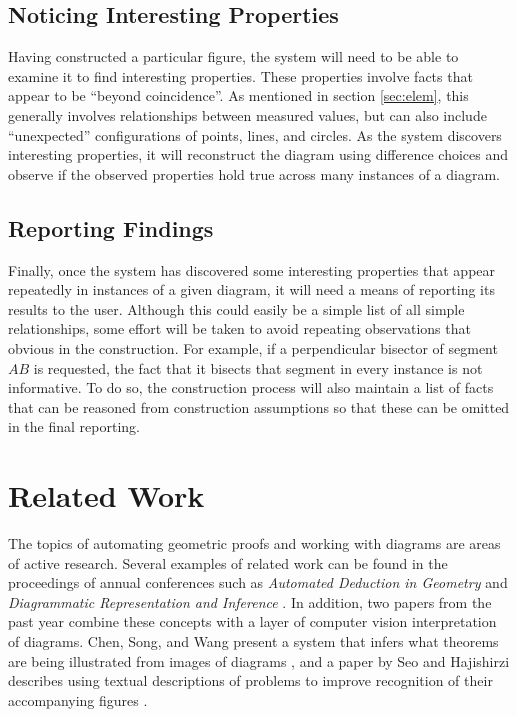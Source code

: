 \documentclass[10pt]{article}
\begin{document}
\subsection{Noticing Interesting Properties}
\label{sec:interest}

Having constructed a particular figure, the system will need to be
able to examine it to find interesting properties.  These properties
involve facts that appear to be ``beyond coincidence''.  As mentioned
in section \ref{sec:elem}, this generally involves relationships
between measured values, but can also include ``unexpected''
configurations of points, lines, and circles.  As the system discovers
interesting properties, it will reconstruct the diagram using
difference choices and observe if the observed properties hold true
across many instances of a diagram.

\subsection{Reporting Findings}

Finally, once the system has discovered some interesting properties
that appear repeatedly in instances of a given diagram, it will need a
means of reporting its results to the user.  Although this could
easily be a simple list of all simple relationships, some effort will
be taken to avoid repeating observations that obvious in the
construction.  For example, if a perpendicular bisector of segment
$AB$ is requested, the fact that it bisects that segment in every
instance is not informative.  To do so, the construction process will
also maintain a list of facts that can be reasoned from construction
assumptions so that these can be omitted in the final reporting.

\section{Related Work}

The topics of automating geometric proofs and working with diagrams
are areas of active research.  Several examples of related work can be
found in the proceedings of annual conferences such as \emph{Automated
  Deduction in Geometry} \cite{autoDeduction} and \emph {Diagrammatic
  Representation and Inference} \cite{diagramInference}.  In addition,
two papers from the past year combine these concepts with a layer of
computer vision interpretation of diagrams.  Chen, Song, and Wang
present a system that infers what theorems are being illustrated from
images of diagrams \cite{fromImages}, and a paper by Seo and
Hajishirzi describes using textual descriptions of problems to improve
recognition of their accompanying figures \cite{diagramUnderstanding}.
\end{document}
